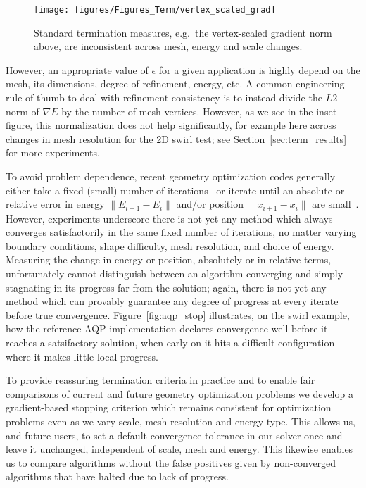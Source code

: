 \begin{wrapfigure}{r}{0.5\linewidth}
  \begin{center}
    \texttt{[image: figures/Figures\_Term/vertex\_scaled\_grad]}
    \caption{Standard termination measures, e.g.\ the vertex-scaled
    gradient norm above, are inconsistent across mesh, energy and scale changes.}
    \label{fig:term_compare_1}
  \end{center}
\end{wrapfigure}
However, an appropriate
value of $\epsilon$ for a given application is highly depend on the mesh, its
dimensions, degree of refinement, energy, etc.
A common engineering rule of thumb to deal with refinement consistency is to instead divide the
$L2$-norm of $\nabla E$ by the number of mesh vertices.  However, as we see in the
inset figure, this normalization does not help significantly, for
example here across changes in mesh resolution for the 2D swirl test;
see Section~\ref{sec:term_results} for more experiments.

To avoid problem dependence, recent geometry optimization
codes generally either take a fixed (small) number of
iterations~\cite{Rabinovich:2016:SLI} or iterate until an
absolute or relative error in energy $\|E_{i+1} -E_i\|$ and/or
position $\| x_{i+1} - x_i \|$ are small~\cite{Shtengel:2017:GOV,Kovalsky:2016:AQP}.
However, experiments underscore there is not yet any method
which always converges satisfactorily in the same fixed number of
iterations, no matter varying boundary conditions, shape difficulty, mesh
resolution, and choice of energy. Measuring the change in
energy or position, absolutely or in relative terms, unfortunately
cannot distinguish between an algorithm converging and simply
stagnating in its progress far from the solution; again, there is not
yet any method which can provably guarantee any degree of progress at every
iterate before true convergence. 
Figure~\ref{fig:aqp_stop} illustrates, on the swirl example, how the
reference AQP implementation declares convergence well before it reaches
a satsifactory solution, when early on it hits a difficult configuration
where it makes little local progress.

To provide reassuring termination criteria in practice and to enable
fair comparisons of current and future geometry
optimization problems we develop a gradient-based stopping criterion
which remains consistent for optimization problems even as we vary
scale, mesh resolution and energy type. This allows us, and future users,
to set a default convergence tolerance in our solver once and leave it
unchanged, independent of scale, mesh and energy. This likewise
enables us to compare algorithms without the false positives
given by non-converged algorithms that have halted due to lack of progress.

